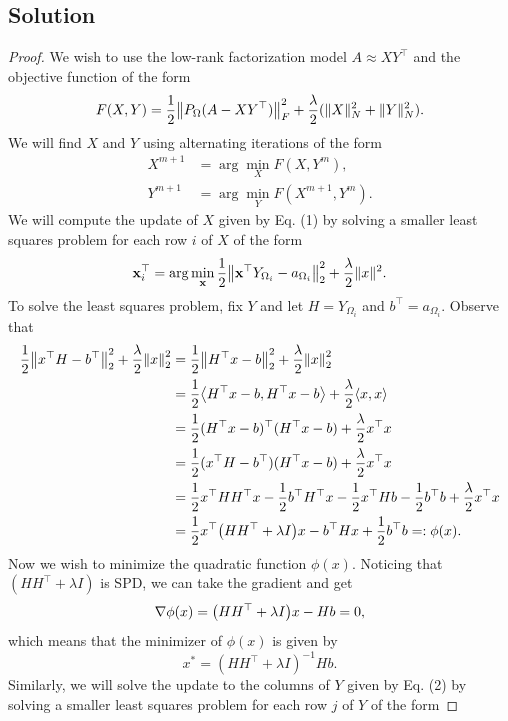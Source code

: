\documentclass[12pt]{report}
\begin{document}
\begin{problem}
\subsection*{Solution}
\begin{proof}

We wish to use the low-rank factorization model $A \approx XY^\top$ and the objective function of the form
\[
    F(X,Y) = \frac{1}{2}{\left\|P_\Omega(A - XY^\top)\right\|}_F^2 + \frac{\lambda}{2}(\|X\|_N^2 + \|Y\|_N^2).
\]
We will find $X$ and $Y$ using alternating iterations of the form
\begin{align}
    X^{m+1} &= \arg \min_X F(X,Y^m),\\
    Y^{m+1} &= \arg \min_Y F(X^{m+1},Y^m).
\end{align}
We will compute the update of $X$ given by Eq. (1) by solving a smaller least squares problem for each row $i$ of $X$ of the form
\[
    \mathbf{x}_i^\top = \arg \min_\mathbf{x}\frac{1}{2}{\left\|\mathbf{x}^\top Y_{\Omega_i} - a_{\Omega_i}\right\|}_2^2 + \frac{\lambda}{2}\|x\|^2.
\]
To solve the least squares problem, fix $Y$ and let $H = Y_{\Omega_i}$ and $b^\top = a_{\Omega_i}$. Observe that
\begin{align*}
    \frac{1}{2}{\left\|x^\top H - b^\top\right\|}_2^2 + \frac{\lambda}{2}{\left\|x\right\|}_2^2 &= \frac{1}{2}{\left\|H^\top x - b\right\|}_2^2 + \frac{\lambda}{2}{\left\|x\right\|}_2^2\\
    &= \frac{1}{2}{\left\langle H^\top x - b,H^\top x - b\right\rangle} + \frac{\lambda}{2}{\left\langle x,x\right\rangle}\\
    &= \frac{1}{2}(H^\top x - b)^\top(H^\top x - b) + \frac{\lambda}{2}x^\top x\\
    &= \frac{1}{2}(x^\top H - b^\top)(H^\top x - b) + \frac{\lambda}{2}x^\top x\\
    &= \frac{1}{2}x^\top H H^\top x - \frac{1}{2}b^\top H^\top x - \frac{1}{2}x^\top H b - \frac{1}{2}b^\top b + \frac{\lambda}{2}x^\top x\\
    &= \frac{1}{2}x^\top{\left(HH^\top + \lambda I\right)}x - b^\top H x + \frac{1}{2}b^\top b =: \phi(x).\\
\end{align*} 
Now we wish to minimize the quadratic function $\phi(x)$. Noticing that $(HH^\top + \lambda I)$ is SPD, we can take the gradient and get
\[
    \nabla \phi(x) = {\left(HH^\top + \lambda I\right)}x - Hb = 0,
\]
which means that the minimizer of $\phi(x)$ is given by
\begin{equation} \label{xupdate}
    x^* = (HH^\top + \lambda I)^{-1} Hb.
\end{equation}
Similarly, we will solve the update to the columns of $Y$ given by Eq. (2) by solving a smaller least squares problem for each row $j$ of $Y$ of the form

\end{proof}
\end{problem}
\end{document}
